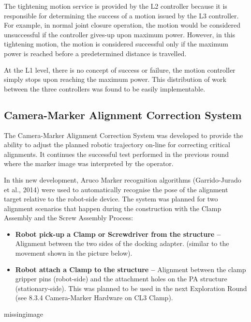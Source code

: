 The tightening motion service is provided by the L2 controller because it is responsible for determining the success of a motion issued by the L3 controller. For example, in normal joint closure operation, the motion would be considered unsuccessful if the controller gives-up upon maximum power. However, in this tightening motion, the motion is considered successful only if the maximum power is reached before a predetermined distance is travelled. 

At the L1 level, there is no concept of success or failure, the motion controller simply stops upon reaching the maximum power. This distribution of work between the three controllers was found to be easily implementable.

\subsection{Camera-Marker Alignment Correction System}
\label{subsection:exploration-4-camera-marker-alignment-correction-system}

The Camera-Marker Alignment Correction System was developed to provide the ability to adjust the planned robotic trajectory on-line for correcting critical alignments. It continues the successful test performed in the previous round  where the marker image was interpreted by the operator. 

In this new development, Aruco Marker recognition algorithms (Garrido-Jurado et al., 2014) were used to automatically recognise the pose of the alignment target relative to the robot-side device. The system was planned for two alignment scenarios that happen during the construction with the Clamp Assembly and the Screw Assembly Process:

\begin{itemize}
    \item \textbf{Robot pick-up a Clamp or Screwdriver from the structure --} Alignment between the two sides of the docking adapter. (similar to the movement shown in the picture below).
    \item \textbf{Robot attach a Clamp to the structure --} Alignment between the clamp gripper pins (robot-side) and the attachment holes on the PA structure (stationary-side). This was planned to be used in the next Exploration Round (see 8.3.4 Camera-Marker Hardware on CL3 Clamp).
\end{itemize}

missingimage


